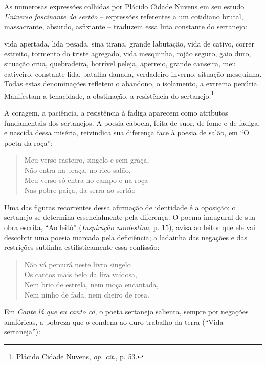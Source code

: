 As numerosas expressões colhidas por Plácido Cidade Nuvens em seu estudo
\textit{Universo fascinante do sertão} -- expressões referentes a um cotidiano brutal,
massacrante, absurdo, asfixiante -- traduzem essa luta constante do sertanejo:

\begin{hedraquote}
vida apertada, lida pesada, sina tirana, grande labutação, vida de cativo,
correr estreito, tormento do triste agregado, vida mesquinha, rojão seguro, gaio
duro, situação crua, quebradeira, horrível peleja, aperreio, grande canseira,
meu cativeiro, constante lida, batalha danada, verdadeiro inverno, situação
mesquinha. Todas estas denominações refletem o abandono, o isolamento, a extrema
penúria. Manifestam a tenacidade, a obstinação, a resistência do
sertanejo.\footnote{ Plácido Cidade Nuvens, \textit{op. cit}., p. 53.}
\end{hedraquote}

A coragem, a paciência, a resistência à fadiga aparecem como atributos
fundamentais dos sertanejos. A poesia cabocla, feita de suor, de fome e de
fadiga, e nascida dessa miséria, reivindica sua diferença face à poesia de
salão, em “O poeta da roça”:

\begin{verse}
Meu verso rasteiro, singelo e sem graça, \\
Não entra na praça, no rico salão, \\
Meu verso só entra no campo e na roça \\
Nas pobre paiça, da serra ao sertão 
\end{verse}

Uma das figuras recorrentes dessa afirmação de identidade é a oposição: o
sertanejo se determina essencialmente pela diferença. O poema inaugural de sua
obra escrita, “Ao leitô” (\textit{Inspiração nordestina}, p. 15), avisa ao leitor que ele vai descobrir uma
poesia marcada pela deficiência; a ladainha das negações e das restrições
sublinha estilisticamente essa confissão:

\begin{verse}
Não vá percurá neste livro singelo\\
Os cantos mais belo da lira vaidosa,\\
Nem brio de estrela, nem moça encantada,\\
Nem ninho de fada, nem cheiro de rosa. 
\end{verse}

Em \textit{Cante lá que eu canto cá}, o poeta sertanejo salienta, sempre por negações
anafóricas, a pobreza que o condena ao duro trabalho da terra (“Vida
sertaneja”):

